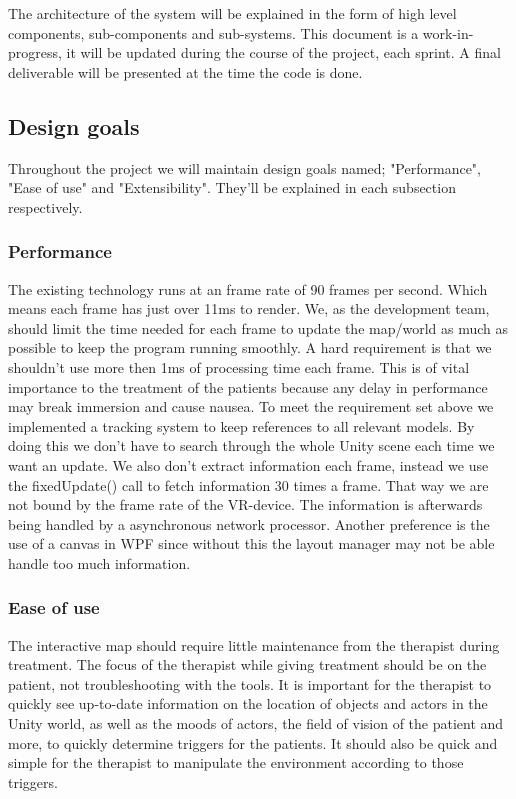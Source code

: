 \documentclass[11pt]{article}
\begin{document}
 The architecture of the system will be explained in the form of high level components, sub-components and sub-systems. This document is a work-in-progress, it will be updated during the course of the project, each sprint. A final deliverable will be presented at the time the code is done.

    \subsection{Design goals}
    Throughout the project we will maintain design goals named; "Performance", "Ease of use" and "Extensibility". They'll be explained in each subsection respectively.

        \subsubsection{Performance}
        The existing technology runs at an frame rate of 90 frames per second. Which means each frame has just over 11ms to render. We, as the development team, should limit the time needed for each frame to update the map/world as much as possible to keep the program running smoothly. A hard requirement is that we shouldn't use more then 1ms of processing time each frame. This is of vital importance to the treatment of the patients because any delay in performance may break immersion and cause nausea.
        \newline
        \newline
        To meet the requirement set above we implemented a tracking system to keep references to all relevant models. By doing this we don't have to search through the whole Unity scene each time we want an update. We also don't extract information each frame, instead we use the fixedUpdate() call to fetch information 30 times a frame. That way we are not bound by the frame rate of the VR-device. The information is afterwards being handled by a asynchronous network processor. Another preference is the use of a canvas in WPF since without this the layout manager may not be able handle too much information.
        

        \subsubsection{Ease of use }
        The interactive map should require little maintenance from the therapist during treatment. The focus of the therapist while giving treatment should be on the patient, not troubleshooting with the tools. It is important for the therapist to quickly see up-to-date information on the location of objects and actors in the \gls{Unity} world, as well as the moods of actors, the field of vision of the patient and more, to quickly determine triggers for the patients. It should also be quick and simple for the therapist to manipulate the environment according to those triggers.
            
\end{document}
